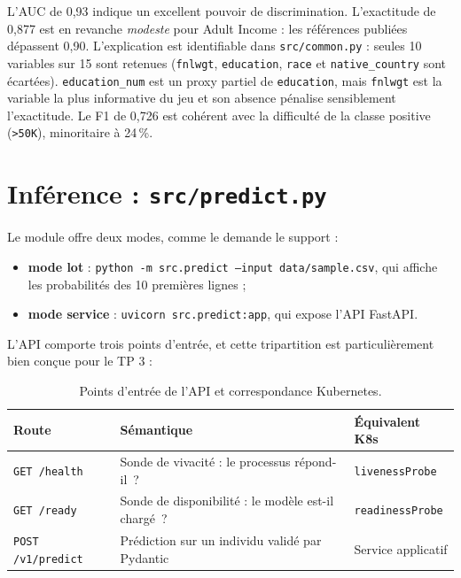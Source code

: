 \documentclass[11pt,a4paper]{report}
\begin{document}
L'AUC de 0,93 indique un excellent pouvoir de discrimination. L'exactitude de
0,877 est en revanche \emph{modeste} pour Adult Income : les références
publiées dépassent 0,90. L'explication est identifiable dans
\texttt{src/common.py} : seules 10 variables sur 15 sont retenues
(\texttt{fnlwgt}, \texttt{education}, \texttt{race} et
\texttt{native\_country} sont écartées). \texttt{education\_num} est un
proxy partiel de \texttt{education}, mais \texttt{fnlwgt} est la variable la
plus informative du jeu et son absence pénalise sensiblement l'exactitude.
Le F1 de 0,726 est cohérent avec la difficulté de la classe positive
(\texttt{>50K}), minoritaire à 24\,\%.

\section{Inférence : \texttt{src/predict.py}}

Le module offre deux modes, comme le demande le support :

\begin{itemize}
  \item \textbf{mode lot} : \texttt{python -m src.predict --input
    data/sample.csv}, qui affiche les probabilités des 10 premières lignes ;
  \item \textbf{mode service} : \texttt{uvicorn src.predict:app}, qui expose
        l'API FastAPI.
\end{itemize}

L'API comporte trois points d'entrée, et cette tripartition est
particulièrement bien conçue pour le TP 3 :

\begin{table}[H]
\centering\small
\begin{tabular}{@{}p{2.6cm}p{9.4cm}p{2.6cm}@{}}
\toprule
\textbf{Route} & \textbf{Sémantique} & \textbf{Équivalent K8s} \\
\midrule
\texttt{GET /health}     & Sonde de vivacité : le processus répond-il~? & \texttt{livenessProbe} \\
\texttt{GET /ready}      & Sonde de disponibilité : le modèle est-il chargé~? & \texttt{readinessProbe} \\
\texttt{POST /v1/predict} & Prédiction sur un individu validé par Pydantic & Service applicatif \\
\bottomrule
\end{tabular}
\caption{Points d'entrée de l'API et correspondance Kubernetes.}
\end{table}
\end{document}
